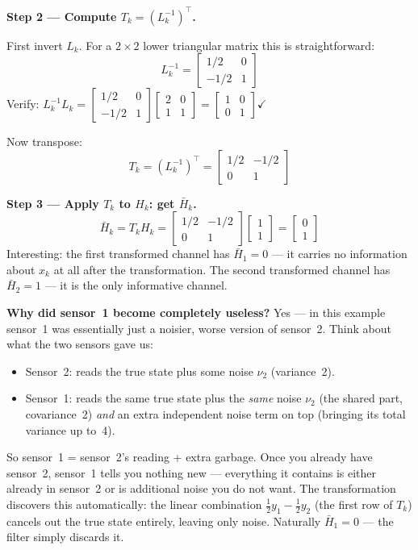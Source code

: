\documentclass[12pt, a4paper]{article}
\begin{document}
\begin{notebox}
  \textbf{Step 2 --- Compute $T_k = (L_k^{-1})^\top$.}

  First invert $L_k$.
  For a $2\times2$ lower triangular matrix this is straightforward:
  \[
    L_k^{-1}
    = \begin{bmatrix} 1/2 & 0 \\ -1/2 & 1 \end{bmatrix}
  \]
  Verify: $L_k^{-1} L_k =
  \begin{bmatrix}1/2&0\\-1/2&1\end{bmatrix}
  \begin{bmatrix}2&0\\1&1\end{bmatrix}
  = \begin{bmatrix}1&0\\0&1\end{bmatrix} \checkmark$

  Now transpose:
  \[
    T_k = (L_k^{-1})^\top
        = \begin{bmatrix} 1/2 & -1/2 \\ 0 & 1 \end{bmatrix}
  \]

  \textbf{Step 3 --- Apply $T_k$ to $H_k$: get $\bar{H}_k$.}
  \[
    \bar{H}_k = T_k H_k
    = \begin{bmatrix} 1/2 & -1/2 \\ 0 & 1 \end{bmatrix}
      \begin{bmatrix} 1 \\ 1 \end{bmatrix}
    = \begin{bmatrix} 0 \\ 1 \end{bmatrix}
  \]
  Interesting: the first transformed channel has $\bar{H}_1 = 0$ ---
  it carries no information about $x_k$ at all after the transformation.
  The second transformed channel has $\bar{H}_2 = 1$ --- it is the only
  informative channel.

  \textbf{Why did sensor~1 become completely useless?}
  Yes --- in this example sensor~1 was essentially just a noisier,
  worse version of sensor~2.
  Think about what the two sensors gave us:
  \begin{itemize}[leftmargin=1.2em, itemsep=2pt]
    \item Sensor~2: reads the true state plus some noise $\nu_2$
      (variance~2).
    \item Sensor~1: reads the same true state plus the \emph{same} noise
      $\nu_2$ (the shared part, covariance~2) \emph{and} an extra
      independent noise term on top (bringing its total variance up
      to~4).
  \end{itemize}
  So sensor~1 = sensor~2's reading + extra garbage.
  Once you already have sensor~2, sensor~1 tells you nothing new ---
  everything it contains is either already in sensor~2 or is additional
  noise you do not want.
  The transformation discovers this automatically: the linear combination
  $\tfrac{1}{2}y_1 - \tfrac{1}{2}y_2$ (the first row of $T_k$) cancels
  out the true state entirely, leaving only noise.
  Naturally $\bar{H}_1 = 0$ --- the filter simply discards it.


\end{notebox}
\end{document}
